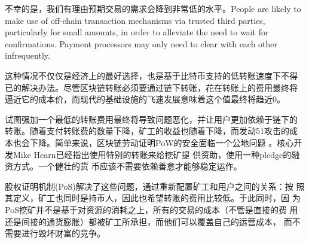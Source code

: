 \documentclass[letterpaper]{article}
\begin{document}
不幸的是，我们有理由预期交易的需求会降到非常低的水平。People are
likely to make use of off-chain transaction mechanisms via trusted
third parties, particularly for small amounts, in order to alleviate
the need to wait for confirmations. Payment processors may only need
to clear with each other infrequently.

这种情况不仅仅是经济上的最好选择，也是基于比特币支持的低转账速度下不得
已的解决办法。尽管区块链转账必须要通过链下转账，花在转账上的费用最终将
逼近它的成本价，而现代的基础设施的飞速发展意味着这个值最终将趋近0。

试图强加一个最低的转账费用最终将导致问题恶化，并让用户更加依赖于链下的
转账。随着支付转账费的数量下降，矿工的收益也随着下降，而发动51攻击的成
本也会下降。简单来说，区块链劳动证明PoW的安全面临一个公地问题
\cite{btccommons}。核心开发Mike Hearn已经指出使用特别的转账来给挖矿提
供资助，使用一种pledge的融资方式\cite{dominantassurance}。一个健壮的货
币应该不需要依赖善意才能够稳定运作。

股权证明机制(PoS)解决了这些问题，通过重新配置矿工和用户之间的关系：按
照其定义，矿工也同时是持币人，因此也希望转账的费用比较低。于此同时，因
为PoS挖矿并不是基于对资源的消耗之上，所有的交易的成本（不管是直接的费
  用还是间接的通货膨胀）都被矿工所承担，而他们可以覆盖自己的运营成本，
而不需要进行毁坏财富的竞争。
\end{document}
